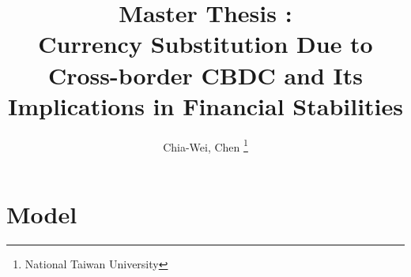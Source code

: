 \documentclass{article}
\title{Master Thesis : \\ 
Currency Substitution Due to Cross-border CBDC and Its Implications in Financial Stabilities}
\author{Chia-Wei, Chen \thanks{National Taiwan University}}
\begin{document}
    \maketitle

    \section{Model}
     

    
    
    
\end{document}
